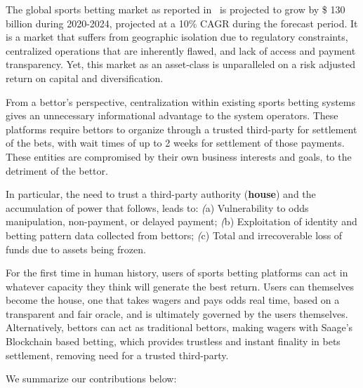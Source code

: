 \documentclass[%
 aapm,
 mph,%
 amsmath,amssymb,
 reprint,%
]{revtex4-2}
\begin{document}
The global sports betting market as reported in~\cite{SportsBets} is projected to grow by \$ 130 billion during 2020-2024, projected at a 10\% CAGR during the forecast period. It is a market that suffers from geographic isolation due to regulatory constraints, centralized operations that are inherently flawed, and lack of access and payment transparency. Yet, this market as an asset-class is unparalleled on a risk adjusted return on capital and diversification.

From a bettor’s perspective, centralization within existing sports betting systems gives an unnecessary informational advantage to the system operators. These platforms require bettors to organize through a trusted third-party for settlement of the bets, with wait times of up to 2 weeks for settlement of those payments. These entities are compromised by their own business interests and goals, to the detriment of the bettor.

In particular, the need to trust a third-party authority (\textbf{house}) and the accumulation of power that follows, leads to: \textit(a) Vulnerability to odds manipulation, non-payment, or delayed payment; \textit(b) Exploitation of identity and betting pattern data collected from bettors; \textit(c) Total and irrecoverable loss of funds due to assets being frozen.

For the first time in human history, users of sports betting platforms can act in whatever capacity they think will generate the best return.  Users can themselves become the house, one that takes wagers and pays odds real time, based on a transparent and fair oracle, and is ultimately governed by the users themselves.  Alternatively, bettors can act as traditional bettors, making wagers with Saage’s Blockchain based betting, which provides trustless and instant finality in bets settlement, removing need for a trusted third-party. 

We summarize our contributions below:
\end{document}

